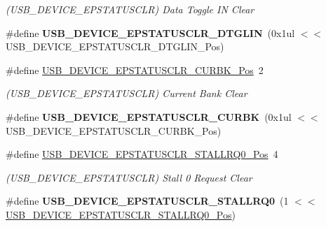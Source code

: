 \begin{DoxyCompactItemize}
\begin{DoxyCompactList}\small\item\em (U\+S\+B\+\_\+\+D\+E\+V\+I\+C\+E\+\_\+\+E\+P\+S\+T\+A\+T\+U\+S\+C\+L\+R) Data Toggle I\+N Clear \end{DoxyCompactList}\item 
\hypertarget{group___s_a_m_l21___u_s_b_gad87489440e4400d1a42d586cbc227379}{}\#define {\bfseries U\+S\+B\+\_\+\+D\+E\+V\+I\+C\+E\+\_\+\+E\+P\+S\+T\+A\+T\+U\+S\+C\+L\+R\+\_\+\+D\+T\+G\+L\+I\+N}~(0x1ul $<$$<$ U\+S\+B\+\_\+\+D\+E\+V\+I\+C\+E\+\_\+\+E\+P\+S\+T\+A\+T\+U\+S\+C\+L\+R\+\_\+\+D\+T\+G\+L\+I\+N\+\_\+\+Pos)\label{group___s_a_m_l21___u_s_b_gad87489440e4400d1a42d586cbc227379}

\item 
\hypertarget{group___s_a_m_l21___u_s_b_ga8fbeed5b3bbc527a317078818e9c02a0}{}\#define \hyperlink{group___s_a_m_l21___u_s_b_ga8fbeed5b3bbc527a317078818e9c02a0}{U\+S\+B\+\_\+\+D\+E\+V\+I\+C\+E\+\_\+\+E\+P\+S\+T\+A\+T\+U\+S\+C\+L\+R\+\_\+\+C\+U\+R\+B\+K\+\_\+\+Pos}~2\label{group___s_a_m_l21___u_s_b_ga8fbeed5b3bbc527a317078818e9c02a0}

\begin{DoxyCompactList}\small\item\em (U\+S\+B\+\_\+\+D\+E\+V\+I\+C\+E\+\_\+\+E\+P\+S\+T\+A\+T\+U\+S\+C\+L\+R) Current Bank Clear \end{DoxyCompactList}\item 
\hypertarget{group___s_a_m_l21___u_s_b_ga4a5d43546baf621d2d1b2097e77d8eab}{}\#define {\bfseries U\+S\+B\+\_\+\+D\+E\+V\+I\+C\+E\+\_\+\+E\+P\+S\+T\+A\+T\+U\+S\+C\+L\+R\+\_\+\+C\+U\+R\+B\+K}~(0x1ul $<$$<$ U\+S\+B\+\_\+\+D\+E\+V\+I\+C\+E\+\_\+\+E\+P\+S\+T\+A\+T\+U\+S\+C\+L\+R\+\_\+\+C\+U\+R\+B\+K\+\_\+\+Pos)\label{group___s_a_m_l21___u_s_b_ga4a5d43546baf621d2d1b2097e77d8eab}

\item 
\hypertarget{group___s_a_m_l21___u_s_b_ga4f1e9ab09bf3cd506bd5ca64adbc0e7b}{}\#define \hyperlink{group___s_a_m_l21___u_s_b_ga4f1e9ab09bf3cd506bd5ca64adbc0e7b}{U\+S\+B\+\_\+\+D\+E\+V\+I\+C\+E\+\_\+\+E\+P\+S\+T\+A\+T\+U\+S\+C\+L\+R\+\_\+\+S\+T\+A\+L\+L\+R\+Q0\+\_\+\+Pos}~4\label{group___s_a_m_l21___u_s_b_ga4f1e9ab09bf3cd506bd5ca64adbc0e7b}

\begin{DoxyCompactList}\small\item\em (U\+S\+B\+\_\+\+D\+E\+V\+I\+C\+E\+\_\+\+E\+P\+S\+T\+A\+T\+U\+S\+C\+L\+R) Stall 0 Request Clear \end{DoxyCompactList}\item 
\hypertarget{group___s_a_m_l21___u_s_b_ga900733e0d38598ac30726a777b8d8118}{}\#define {\bfseries U\+S\+B\+\_\+\+D\+E\+V\+I\+C\+E\+\_\+\+E\+P\+S\+T\+A\+T\+U\+S\+C\+L\+R\+\_\+\+S\+T\+A\+L\+L\+R\+Q0}~(1 $<$$<$ \hyperlink{group___s_a_m_l21___u_s_b_ga4f1e9ab09bf3cd506bd5ca64adbc0e7b}{U\+S\+B\+\_\+\+D\+E\+V\+I\+C\+E\+\_\+\+E\+P\+S\+T\+A\+T\+U\+S\+C\+L\+R\+\_\+\+S\+T\+A\+L\+L\+R\+Q0\+\_\+\+Pos})\label{group___s_a_m_l21___u_s_b_ga900733e0d38598ac30726a777b8d8118}


\end{DoxyCompactItemize}
